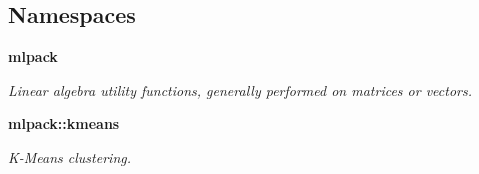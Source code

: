 \subsection*{Namespaces}
\begin{DoxyCompactItemize}
\item 
 {\bf mlpack}
\begin{DoxyCompactList}\small\item\em Linear algebra utility functions, generally performed on matrices or vectors. \end{DoxyCompactList}\item 
 {\bf mlpack\+::kmeans}
\begin{DoxyCompactList}\small\item\em K-\/\+Means clustering. \end{DoxyCompactList}\end{DoxyCompactItemize}
